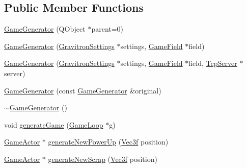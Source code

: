 \subsection*{Public Member Functions}
\begin{DoxyCompactItemize}
\item 
\hyperlink{class_game_generator_a6d2a4240e25126da4a6646835f7b1a28}{Game\+Generator} (Q\+Object $\ast$parent=0)
\item 
\hyperlink{class_game_generator_ae50a42e8512131b500b37db65d2bb4ce}{Game\+Generator} (\hyperlink{class_gravitron_settings}{Gravitron\+Settings} $\ast$settings, \hyperlink{class_game_field}{Game\+Field} $\ast$field)
\item 
\hyperlink{class_game_generator_a1912c6f1efadf83c48e5a73a95ab464e}{Game\+Generator} (\hyperlink{class_gravitron_settings}{Gravitron\+Settings} $\ast$settings, \hyperlink{class_game_field}{Game\+Field} $\ast$field, \hyperlink{class_tcp_server}{Tcp\+Server} $\ast$server)
\item 
\hyperlink{class_game_generator_afacbbddbe5e11a62ec6f59df93d384fe}{Game\+Generator} (const \hyperlink{class_game_generator}{Game\+Generator} \&original)
\item 
\hyperlink{class_game_generator_a2376a3b5b93faf7c1c592cb70297fd7c}{$\sim$\+Game\+Generator} ()
\item 
void \hyperlink{class_game_generator_a13f50521a481baafdae183e44d410977}{generate\+Game} (\hyperlink{class_game_loop}{Game\+Loop} $\ast$g)
\item 
\hyperlink{class_game_actor}{Game\+Actor} $\ast$ \hyperlink{class_game_generator_acd01e34ebb3653724b238c5e1fedc3ad}{generate\+New\+Power\+Up} (\hyperlink{class_vec3f}{Vec3f} position)
\item 
\hyperlink{class_game_actor}{Game\+Actor} $\ast$ \hyperlink{class_game_generator_a8b44d635c748aaf630afb41ad21a368e}{generate\+New\+Scrap} (\hyperlink{class_vec3f}{Vec3f} position)
\end{DoxyCompactItemize}


